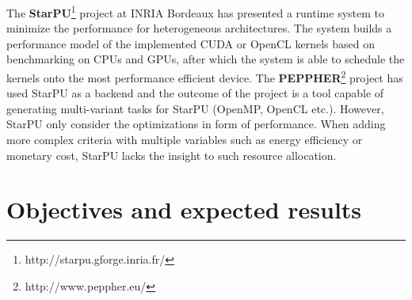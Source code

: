 \documentclass{article}
\begin{document}
The \textbf{StarPU}\footnote{http://starpu.gforge.inria.fr/} project at INRIA Bordeaux has presented a runtime system to minimize the performance for heterogeneous architectures. 
The system builds a performance model of the implemented CUDA or OpenCL kernels based on benchmarking on CPUs and GPUs, after which the system is able to schedule the kernels onto the most performance efficient device. 
The \textbf{PEPPHER}\footnote{http://www.peppher.eu/} project has used StarPU as a backend and the outcome of the project is a tool capable of generating multi-variant tasks for StarPU (OpenMP, OpenCL etc.). 
However, StarPU only consider the optimizations in form of performance. 
When adding more complex criteria with multiple variables such as energy efficiency or monetary cost, StarPU lacks the insight to such resource allocation.
\clearpage


\section{Objectives and expected results}
\end{document}
